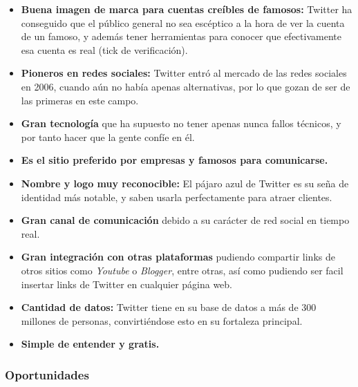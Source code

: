 \begin{itemize}

\item \textbf{Buena imagen de marca para cuentas creíbles de famosos:} Twitter ha conseguido que el público general no sea escéptico a la hora de ver la cuenta de un famoso, y además tener herramientas para conocer que efectivamente esa cuenta es real (tick de verificación).
\item \textbf{Pioneros en redes sociales:} Twitter entró al mercado de las redes sociales en 2006, cuando aún no había apenas alternativas, por lo que gozan de ser de las primeras en este campo.
\item \textbf{Gran tecnología} que ha supuesto no tener apenas nunca fallos técnicos, y por tanto hacer que la gente confíe en él. 
\item \textbf{Es el sitio preferido por empresas y famosos para comunicarse.}
\item \textbf{Nombre y logo muy reconocible:} El pájaro azul de Twitter es su seña de identidad más notable, y saben usarla perfectamente para atraer clientes.
\item \textbf{Gran canal de comunicación} debido a su carácter de red social en tiempo real.
\item \textbf{Gran integración con otras plataformas} pudiendo compartir links de otros sitios como \textit{Youtube} o \textit{Blogger}, entre otras, así como pudiendo ser facil insertar links de Twitter en cualquier página web.
\item \textbf{Cantidad de datos:} Twitter tiene en su base de datos a más de 300 millones de personas, convirtiéndose esto en su fortaleza principal.
\item \textbf{Simple de entender y gratis.}

\end{itemize}

\subsubsection{Oportunidades}

